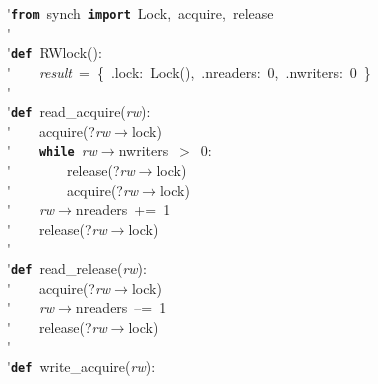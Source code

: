 \'\>\texttt{\textbf{from}}~synch~\texttt{\textbf{import}}~Lock,~acquire,~release\\

\'\>\\

\'\>\texttt{\textbf{def}}~RWlock():\\

\'\>~~~~\textit{result}~=~\{~.lock:~Lock(),~.nreaders:~0,~.nwriters:~0~\}\\

\'\>\\

\'\>\texttt{\textbf{def}}~read\_acquire(\textit{rw}):\\

\'\>~~~~acquire(?\textit{rw}$\rightarrow$lock)\\

\'\>~~~~\texttt{\textbf{while}}~\textit{rw}$\rightarrow$nwriters~$>$~0:\\

\'\>~~~~~~~~release(?\textit{rw}$\rightarrow$lock)\\

\'\>~~~~~~~~acquire(?\textit{rw}$\rightarrow$lock)\\

\'\>~~~~\textit{rw}$\rightarrow$nreaders~+=~1\\

\'\>~~~~release(?\textit{rw}$\rightarrow$lock)\\

\'\>\\

\'\>\texttt{\textbf{def}}~read\_release(\textit{rw}):\\

\'\>~~~~acquire(?\textit{rw}$\rightarrow$lock)\\

\'\>~~~~\textit{rw}$\rightarrow$nreaders~--=~1\\

\'\>~~~~release(?\textit{rw}$\rightarrow$lock)\\

\'\>\\

\'\>\texttt{\textbf{def}}~write\_acquire(\textit{rw}):\\

